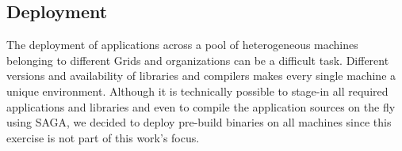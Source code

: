 \documentclass[conference,final]{IEEEtran}
\begin{document}

\subsection{Deployment}
The deployment of applications across a pool of heterogeneous machines
belonging to different Grids and organizations can be a difficult
task. Different versions and availability of libraries and compilers
makes every single machine a unique environment. Although it is
technically possible to stage-in all required applications and
libraries and even to compile the application sources on the fly using
SAGA, we decided to deploy pre-build binaries on all machines since
this exercise is not part of this work's focus.



\end{document}
